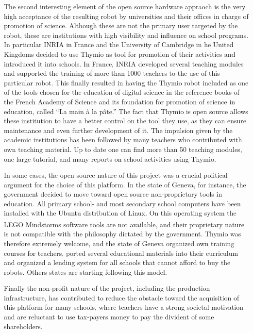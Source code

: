 \documentclass[letterpaper, 10 pt, conference]{ieeeconf}  %
\begin{document}
The second interesting element of the open source hardware appraoch is the very high acceptance of the resulting robot by universities and their offices in charge of promotion of science.
Although these are not the primary user targeted by the robot, these are institutions with high visibility and influence on school programs. 
In particular INRIA in France and the University of Cambridge in he United Kingdoms decided to use Thymio as tool for promotion of their activities and introduced it into schools.
In France, INRIA developed several teaching modules and supported the training of more than 1000 teachers to the use of this particular robot. 
This finally resulted in having the Thymio robot included as one of the tools chosen for the education of digital science in the reference books of the French Academy of Science and its foundation for promotion of science in education, called ``La main \`a la p\^ate.''
The fact that Thymio is open source allows these institution to have a better control on the tool they use, as they can ensure maintenance and even further development of it. 
The impulsion given by the academic institutions has been followed by many teachers who contributed with own teaching material. 
Up to date one can find more than 50 teaching modules, one large tutorial, and many reports on school activities using Thymio. 

In some cases, the open source nature of this project was a crucial political argument for the choice of this platform.
In the state of Geneva, for instance, the government decided to move toward open source non-proprietary tools in education.
All primary school- and most secondary school computers have been installed with the Ubuntu distribution of Linux. 
On this operating system the LEGO\textsuperscript{\textregistered} Mindstorms\textsuperscript{\textregistered} software tools are not available, and their proprietary nature is not compatible with the philosophy dictated by the government. 
Thymio was therefore extremely welcome, and the state of Geneva organized own training courses for teachers, ported several educational materials into their curriculum and organized a lending system for all schools that cannot afford to buy the robots.
Others states are starting following this model.

Finally the non-profit nature of the project, including the production infrastructure, has contributed to reduce the obstacle toward the acquisition of this platform for many schools, where teachers have a strong societal motivation and are reluctant to use tax-payers money to pay the divident of some shareholders.
\end{document}
